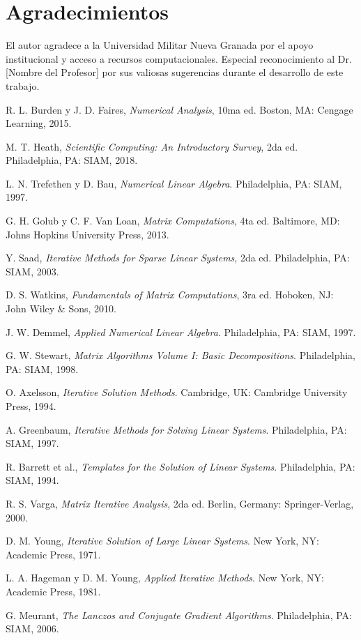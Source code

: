 \documentclass[conference]{IEEEtran}
\begin{document}
\section*{Agradecimientos}

El autor agradece a la Universidad Militar Nueva Granada por el apoyo institucional y acceso a recursos computacionales. Especial reconocimiento al Dr. [Nombre del Profesor] por sus valiosas sugerencias durante el desarrollo de este trabajo.

\begin{thebibliography}{00}
 R. L. Burden y J. D. Faires, \emph{Numerical Analysis}, 10ma ed. Boston, MA: Cengage Learning, 2015.

 M. T. Heath, \emph{Scientific Computing: An Introductory Survey}, 2da ed. Philadelphia, PA: SIAM, 2018.

 L. N. Trefethen y D. Bau, \emph{Numerical Linear Algebra}. Philadelphia, PA: SIAM, 1997.

 G. H. Golub y C. F. Van Loan, \emph{Matrix Computations}, 4ta ed. Baltimore, MD: Johns Hopkins University Press, 2013.

 Y. Saad, \emph{Iterative Methods for Sparse Linear Systems}, 2da ed. Philadelphia, PA: SIAM, 2003.

 D. S. Watkins, \emph{Fundamentals of Matrix Computations}, 3ra ed. Hoboken, NJ: John Wiley \& Sons, 2010.

 J. W. Demmel, \emph{Applied Numerical Linear Algebra}. Philadelphia, PA: SIAM, 1997.

 G. W. Stewart, \emph{Matrix Algorithms Volume I: Basic Decompositions}. Philadelphia, PA: SIAM, 1998.

 O. Axelsson, \emph{Iterative Solution Methods}. Cambridge, UK: Cambridge University Press, 1994.

 A. Greenbaum, \emph{Iterative Methods for Solving Linear Systems}. Philadelphia, PA: SIAM, 1997.

 R. Barrett et al., \emph{Templates for the Solution of Linear Systems}. Philadelphia, PA: SIAM, 1994.

 R. S. Varga, \emph{Matrix Iterative Analysis}, 2da ed. Berlin, Germany: Springer-Verlag, 2000.

 D. M. Young, \emph{Iterative Solution of Large Linear Systems}. New York, NY: Academic Press, 1971.

 L. A. Hageman y D. M. Young, \emph{Applied Iterative Methods}. New York, NY: Academic Press, 1981.

 G. Meurant, \emph{The Lanczos and Conjugate Gradient Algorithms}. Philadelphia, PA: SIAM, 2006.

\end{thebibliography}
\end{document}
